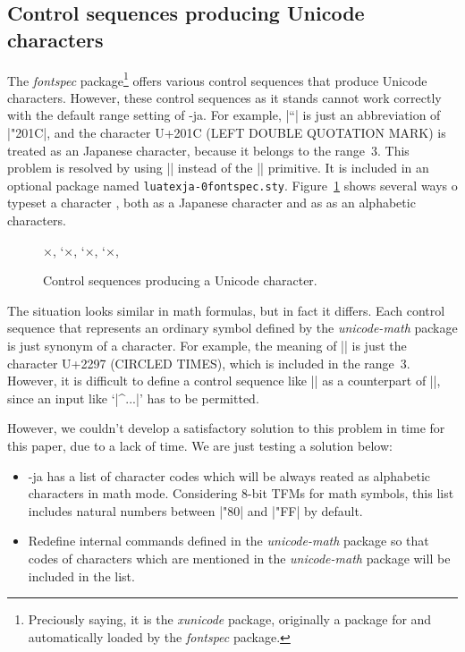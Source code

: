 \documentclass{ajt}
\begin{document}
\subsection{Control sequences producing Unicode characters}
\label{ssec-unichar}

The \emph{fontspec} package\footnote{Preciously saying, it is the
\emph{xunicode} package, originally a package for \XeTeX and
automatically loaded by the \emph{fontspec} package.} offers various
control sequences that produce Unicode characters.  However, these
control sequences as it stands cannot work correctly with the default
range setting of \LuaTeX-ja.  For example, |\textquotedblleft| is just
an abbreviation of |\char"201C\relax|, and the character U+201C (LEFT %
DOUBLE QUOTATION MARK) is treated as an Japanese character, because it
belongs to the range~3.  This problem is resolved by using |\ltjalchar|
instead of the |\char| primitive.  It is included in an optional package
named \texttt{luatexja-\penalty0fontspec.sty}.  Figure~\ref{fig-unitxt}
shows several ways o typeset a character , both as a Japanese character
and as as an alphabetic characters.

\begin{figure}
\begin{LTXexample}
×, \char`×,   %
\ltjalchar`×, %
\ltjjachar`×, %
\texttimes     %
\end{LTXexample}
\caption{Control sequences producing a Unicode character.}
\label{fig-unitxt}
\end{figure}

The situation looks similar in math formulas, but in fact it differs.
Each control sequence that represents an ordinary symbol defined by the
\emph{unicode-math} package is just synonym of a character. For example,
the meaning of |\otimes| is just the character U+2297 (CIRCLED TIMES),
which is included in the range~3.  However, it is difficult to define a
control sequence like |\ltjalUmathchar| as a counterpart of
|\Umathchar|, since an input like `|\sum^\ltjalUmathchar ...|' has to be
permitted.

However, we couldn't develop a satisfactory solution to this problem in
time for this paper, due to a lack of time. We are just testing a
solution below:
\begin{itemize}
\item \LuaTeX-ja has a list of character codes which will be always reated as
      alphabetic characters in math mode. Considering 8-bit TFMs for
      math symbols, this list includes natural numbers between |"80| and
      |"FF| by default.
\item Redefine internal commands defined in the \emph{unicode-math}
      package so that
codes of characters which are mentioned in the \emph{unicode-math}
      package will be included in the list.
\end{itemize}
\end{document}
